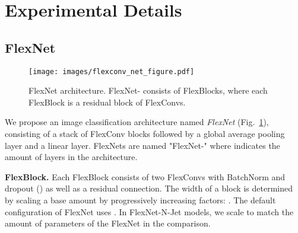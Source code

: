 \documentclass{article} \usepackage{iclr2022_conference,times}
\begin{document}
\begin{table}
\centering
\caption{Results on STL-10. We train each model with three different seeds and report mean and standard deviation. *Results are taken from \citet{luo2020extended}. \dagger Results are from single run.}
\label{tab:stl10}
\begin{center}
\end{center}
\end{table}

\section{Experimental Details}

\subsection{FlexNet}
\label{sec:appx-flexnet}

\begin{figure}[t]
    \centering
    \texttt{[image: images/flexconv\_net\_figure.pdf]}
    \vspace{-5mm}
    \caption{FlexNet architecture. FlexNet- consists of  FlexBlocks, where each FlexBlock is a residual block of FlexConvs.}
    \label{fig:flexnet-architecture}
    \vspace{-5mm}
\end{figure}

We propose an image classification architecture named \textit{FlexNet} (Fig.~\ref{fig:flexnet-architecture}), consisting of a stack of FlexConv blocks followed by a global average pooling layer and a linear layer. FlexNets are named "FlexNet-" where  indicates the amount of layers in the architecture.

\textbf{FlexBlock.} Each FlexBlock consists of two FlexConvs with BatchNorm \citep{ioffe2015batch} and dropout \citep{srivastava14a} () as well as a residual connection. The width of a block  is determined by scaling a base amount  by progressively increasing factors: . The default configuration of FlexNet uses . In FlexNet-N-Jet models, we scale  to match the amount of parameters of the FlexNet in the comparison.
\end{document}
